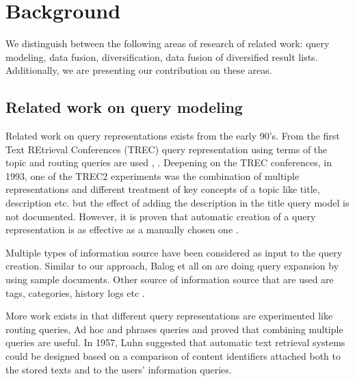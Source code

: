 
\chapter{Background}

We distinguish between the following areas of research of related work: query modeling, data fusion, diversification, data fusion of diversified result lists. Additionally, we are presenting our contribution on these areas.

\section{Related work on query modeling}


Related work on query representations exists from the early 90's. From the first Text REtrieval Conferences (TREC) query representation using terms of the topic and routing queries are used \cite{Trec1}, \cite{Trec2}. Deepening on the TREC conferences, in 1993, one of the TREC2 experiments was the combination of multiple representations and different treatment of key concepts of a topic like title, description etc. but the effect of adding the description in the title query model is not documented. However, it is proven that automatic creation of a query representation is as effective as a manually chosen one \cite{Trec2}.

Multiple types of information source have been considered as input to the query creation. Similar to our approach, Balog et all on \cite{BalogWeekamp} are doing query expansion by using sample documents. Other source of information source that are used are tags, categories, history logs etc \cite{MeijEdgar}.

More work exists in \cite{CallanCroft} that different query representations are experimented like routing queries, Ad hoc and phrases queries and proved that combining multiple queries are useful. In 1957, Luhn \cite{Luhn} suggested that automatic text retrieval systems could be designed based on a comparison of content identifiers attached both to the stored texts and to the users’ information queries.

